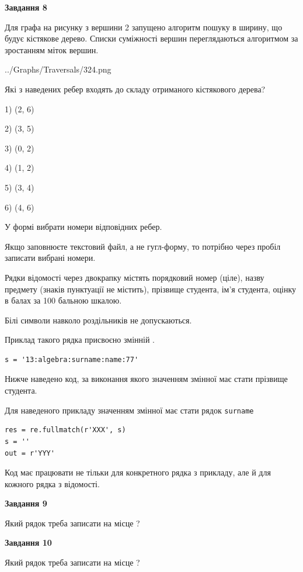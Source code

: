 \documentclass[12pt, ukrainian]{article}
\def\code#1{\Verb!#1!}
\begin{document}
{\begin {large}
{\begin {center}\textbf{Завдання 8}\end {center}}\par
Для графа на рисунку з вершини 2 запущено алгоритм пошуку в ширину, що будує кістякове дерево. Списки суміжності вершин переглядаються алгоритмом за зростанням міток вершин.\par
\begin{center}
	{../Graphs/Traversals/324.png}
\end{center}
\par Які з наведених ребер входять до складу отриманого кістякового дерева?\par
1) (2, 6)\par
2) (3, 5)\par
3) (0, 2)\par
4) (1, 2)\par
5) (3, 4)\par
6) (4, 6)\par
{\vskip 15pt} У формі вибрати номери відповідних ребер.


Якщо заповнюєте текстовий файл, а не гугл-форму, то потрібно через пробіл записа\-ти вибрані номери.\par
\newpage


Рядки відомості через двокрапку містять порядковий номер (ціле), назву предмету (знаків пунктуації не містить), прізвище студента, ім'я студента, оцінку в балах за 100 бальною шкалою.

Білі символи навколо роздільників не допускаються.

Приклад такого рядка присвоєно змінній .



\begin{verbatim}
s = '13:algebra:surname:name:77'
\end{verbatim}


Нижче наведено код, за виконання якого значенням змінної  має стати прізвище студента.

Для наведеного прикладу значенням змінної  має стати рядок \code{surname}



\begin{verbatim}
res = re.fullmatch(r'XXX', s)
s = ''
out = r'YYY'
\end{verbatim}


Код має працювати не тільки для конкретного рядка з прикладу, але й для кожного рядка з відомості.

{\begin {center}\textbf{Завдання 9}\end {center}}\par
Який рядок треба записати на місце  ?\par
\vspace{5mm}


{\begin {center}\textbf{Завдання 10}\end {center}}\par
Який рядок треба записати на місце  ?\par


\newpage


\end {large}}
\end{document}
